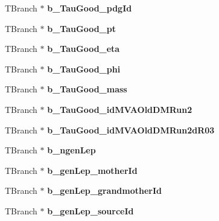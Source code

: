 \begin{DoxyCompactItemize}
\item 
\hypertarget{classMiniTree_a498ff2639bfa1d5f2f89af7585ea0030}{}\label{classMiniTree_a498ff2639bfa1d5f2f89af7585ea0030} 
T\+Branch $\ast$ {\bfseries b\+\_\+\+Tau\+Good\+\_\+pdg\+Id}
\item 
\hypertarget{classMiniTree_ad77537d0e374a72d8ba400e26e87e2e8}{}\label{classMiniTree_ad77537d0e374a72d8ba400e26e87e2e8} 
T\+Branch $\ast$ {\bfseries b\+\_\+\+Tau\+Good\+\_\+pt}
\item 
\hypertarget{classMiniTree_acb6fc05a4307560b7102fdc00c86723e}{}\label{classMiniTree_acb6fc05a4307560b7102fdc00c86723e} 
T\+Branch $\ast$ {\bfseries b\+\_\+\+Tau\+Good\+\_\+eta}
\item 
\hypertarget{classMiniTree_a2a6c7b05d6bedf33d996df81fc237c28}{}\label{classMiniTree_a2a6c7b05d6bedf33d996df81fc237c28} 
T\+Branch $\ast$ {\bfseries b\+\_\+\+Tau\+Good\+\_\+phi}
\item 
\hypertarget{classMiniTree_aed880b864c6437a2713d9c1def60bc94}{}\label{classMiniTree_aed880b864c6437a2713d9c1def60bc94} 
T\+Branch $\ast$ {\bfseries b\+\_\+\+Tau\+Good\+\_\+mass}
\item 
\hypertarget{classMiniTree_a3247219524b69ec64e1425bb52cfd23d}{}\label{classMiniTree_a3247219524b69ec64e1425bb52cfd23d} 
T\+Branch $\ast$ {\bfseries b\+\_\+\+Tau\+Good\+\_\+id\+M\+V\+A\+Old\+D\+M\+Run2}
\item 
\hypertarget{classMiniTree_a92ee89ae817bd363af0551b19c1525d2}{}\label{classMiniTree_a92ee89ae817bd363af0551b19c1525d2} 
T\+Branch $\ast$ {\bfseries b\+\_\+\+Tau\+Good\+\_\+id\+M\+V\+A\+Old\+D\+M\+Run2d\+R03}
\item 
\hypertarget{classMiniTree_a1141a557600590375c4f4220e37a900f}{}\label{classMiniTree_a1141a557600590375c4f4220e37a900f} 
T\+Branch $\ast$ {\bfseries b\+\_\+ngen\+Lep}
\item 
\hypertarget{classMiniTree_a9f5906a846189ad7938626155b84e64f}{}\label{classMiniTree_a9f5906a846189ad7938626155b84e64f} 
T\+Branch $\ast$ {\bfseries b\+\_\+gen\+Lep\+\_\+mother\+Id}
\item 
\hypertarget{classMiniTree_a617565182639ac61d5a02376aaff1a24}{}\label{classMiniTree_a617565182639ac61d5a02376aaff1a24} 
T\+Branch $\ast$ {\bfseries b\+\_\+gen\+Lep\+\_\+grandmother\+Id}
\item 
\hypertarget{classMiniTree_ac2ae9a14b945275d47f819e127795406}{}\label{classMiniTree_ac2ae9a14b945275d47f819e127795406} 
T\+Branch $\ast$ {\bfseries b\+\_\+gen\+Lep\+\_\+source\+Id}
\item 
\hypertarget{classMiniTree_a99deb335fa8f5ab90aae8cdedd06dd9d}{}\label{classMiniTree_a99deb335fa8f5ab90aae8cdedd06dd9d} 

\end{DoxyCompactItemize}
